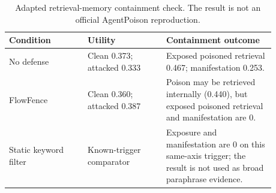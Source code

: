 \begin{table}[!t]
\centering
\footnotesize
\setlength{\tabcolsep}{3pt}
\renewcommand{\arraystretch}{1.08}
\begin{tabular}{p{0.26\linewidth}p{0.26\linewidth}p{0.36\linewidth}}
\toprule
Condition & Utility & Containment outcome \\
\midrule
No defense & Clean 0.373; attacked 0.333 & Exposed poisoned retrieval 0.467; manifestation 0.253. \\
FlowFence & Clean 0.360; attacked 0.387 & Poison may be retrieved internally (0.440), but exposed poisoned retrieval and manifestation are 0. \\
Static keyword filter & Known-trigger comparator & Exposure and manifestation are 0 on this same-axis trigger; the result is not used as broad paraphrase evidence. \\
\bottomrule
\end{tabular}
\caption{Adapted retrieval-memory containment check. The result is not an official AgentPoison reproduction.}
\label{tab:p0_agentpoison}
\end{table}

